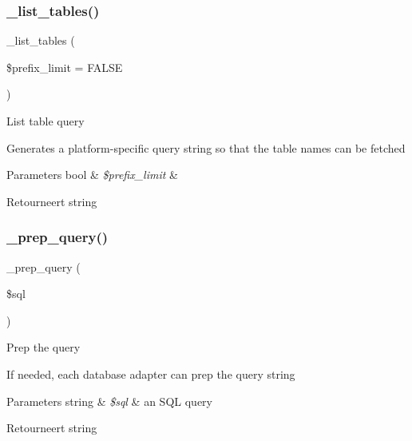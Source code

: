 \subsubsection{\texorpdfstring{\_list\_tables()}{\_list\_tables()}}
{\footnotesize\ttfamily \+\_\+list\+\_\+tables (\begin{DoxyParamCaption}\item[{}]{\$prefix\+\_\+limit = {\ttfamily FALSE} }\end{DoxyParamCaption})\hspace{0.3cm}{\ttfamily [protected]}}

List table query

Generates a platform-\/specific query string so that the table names can be fetched


\begin{DoxyParams}[1]{Parameters}
bool & {\em \$prefix\+\_\+limit} & \\
\hline
\end{DoxyParams}
\begin{DoxyReturn}{Retourneert}
string 
\end{DoxyReturn}
\mbox{\label{class_c_i___d_b__mysqli__driver_a86af88ef0fa6d44ab4691e3f53270339}} 
\subsubsection{\texorpdfstring{\_prep\_query()}{\_prep\_query()}}
{\footnotesize\ttfamily \+\_\+prep\+\_\+query (\begin{DoxyParamCaption}\item[{}]{\$sql }\end{DoxyParamCaption})\hspace{0.3cm}{\ttfamily [protected]}}

Prep the query

If needed, each database adapter can prep the query string


\begin{DoxyParams}[1]{Parameters}
string & {\em \$sql} & an S\+QL query \\
\hline
\end{DoxyParams}
\begin{DoxyReturn}{Retourneert}
string 
\end{DoxyReturn}
\mbox{\label{class_c_i___d_b__mysqli__driver_ac81ac882c1d54347d810199a15856aac}} 
